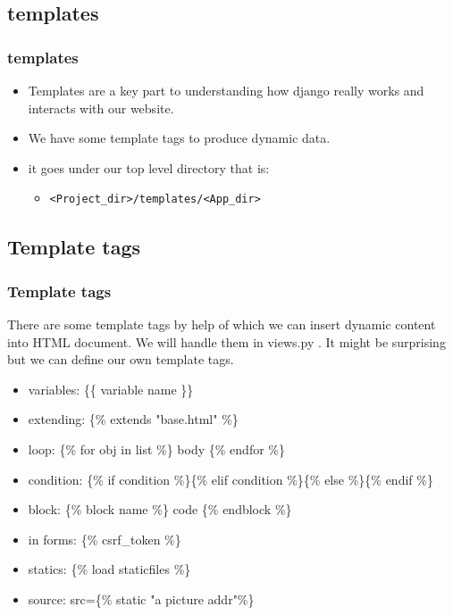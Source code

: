 \documentclass{beamer}
\begin{document}
\subsection{templates}
\begin{frame}[fragile]
\frametitle{templates}
\begin{itemize}
	\item Templates are a key part to understanding how django really works and interacts with our website.
	\item We have some template tags to produce dynamic data.
	\item it goes under our top level directory that is:
	\begin{itemize}
		\item 
		\lstset{language=Bash}
		\begin{lstlisting}[frame=single]
<Project_dir>/templates/<App_dir>\end{lstlisting}
		
	\end{itemize}
\end{itemize}
\end{frame}

\subsection{Template tags}
\begin{frame}
	\frametitle{Template tags}
	There are some template tags by help of which we can insert dynamic content into HTML document. We will handle them in views.py . It might be surprising but we can define our own template tags.
	\begin{itemize}
		\item variables: \{\{ variable name \}\}
		\item extending: \{\% extends "base.html" \%\}
		\item loop: \{\% for obj in list \%\} body \{\% endfor \%\}
		\item condition: \{\% if condition \%\}\{\% elif condition \%\}\{\% else \%\}\{\% endif \%\}
		\item block: \{\% block name \%\} code \{\% endblock \%\}
		\item in forms: \{\% csrf\_token \%\}
		\item statics: \{\% load staticfiles \%\}
		\item source: src=\{\% static "a picture addr"\%\}
	\end{itemize}
\end{frame}
\end{document}
